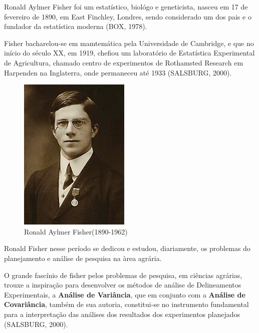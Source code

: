 Ronald Aylmer Fisher foi um estatístico, biológo e geneticista, nasceu em 17 de fevereiro de 1890, em East Finchley, Londres, sendo considerado um dos pais e o fundador da estatística moderna (BOX, 1978).\vskip0.3cm


Fisher bacharelou-se em mamtemática pela Universidade de Cambridge, e que no início do século XX, em 1919, chefiou um laboratório de Estatística Experimental de Agricultura, chamado centro de experimentos de Rothamsted Research em Harpenden na Inglaterra, onde permaneceu até 1933 (SALSBURG, 2000).

\vspace{-1.2cm}

\begin{figure}
    \centering
\includegraphics[scale=0.5]{figures/fisher.jpeg}
    \caption{Ronald Aylmer Fisher(1890-1962)}
    \label{fig:my_label3}
\end{figure}


Ronald Fisher nesse período se dedicou e estudou, diariamente, os problemas do planejamento e análise de pesquisa na àrea agrária. \vskip0.3cm


O grande fascínio de fisher pelos problemas de pesquisa, em ciências agrárias, trouxe a inspiração para desenvolver os métodos de análise de Delineamentos Experimentais, a \textbf{Análise de Variância}, que em conjunto com a \textbf{Análise de Covariância}, também de sua autoria, constitui-se no instrumento fundamental para a interpretação das análises dos resultados dos experimentos planejados (SALSBURG, 2000). \vskip0.3cm




